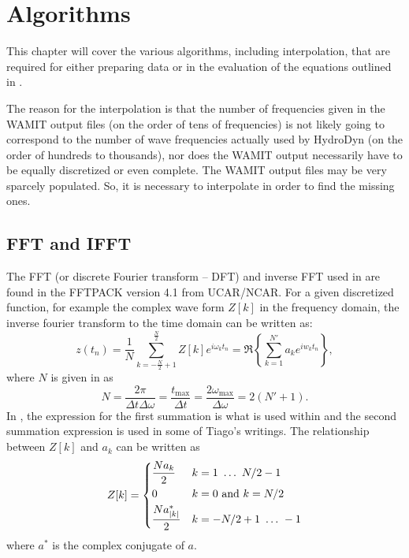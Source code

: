 \chapter{Algorithms}
\label{chap:Algorithm}

This chapter will cover the various algorithms, including interpolation, that are required for either preparing data or in the evaluation of the equations outlined in .


The reason for the interpolation is that the number of frequencies given in the WAMIT output files (on the order of tens of frequencies) is not likely going to correspond to the number of wave frequencies actually used by HydroDyn (on the order of hundreds to thousands), nor does the WAMIT output necessarily have to be equally discretized or even complete.  The WAMIT output files may be very sparcely populated.  So, it is necessary to interpolate in order to find the missing ones.



\section{FFT and IFFT}
\label{sec:Algorithm:FFT}

The FFT (or discrete Fourier transform -- DFT) and inverse FFT used in \HD are found in the FFTPACK version 4.1 from UCAR/NCAR.  For a given discretized function, for example the complex wave form $Z[k]$ in the frequency domain, the inverse fourier transform to the time domain can be written as:
\begin{equation}
   z(t_n) = \frac{1}{N} \sum\limits_{k=-\frac{N}{2}+1}^{\frac{N}{2}} Z[k] e^{i\omega_k t_n} = \Re\left\{\sum\limits_{k=1}^{N'}a_k e^{iw_k t_n}\right\},
\label{eq:IFFTofZ}
\end{equation}
where $N$ is given in  as
\begin{equation}
   N=\frac{2 \pi}{\Delta t \Delta \omega} = \frac{t_\text{max}}{\Delta t} = \frac{2 \omega_\text{max}}{\Delta \omega} = 2(N'+1).
\label{eq:IFFT_N}
\end{equation}
In , the expression for the first summation is what is used within \HD and the second summation expression is used in some of Tiago's writings.  The relationship between $Z[k]$ and $a_k$ can be written as
\begin{equation}
   Z[k] =
         \begin{dcases*}
            \frac{N a_k}{2}            & $k=1 ~\ldots~ N/2-1$\\
            0                          & $k=0$ and $k=N/2$\\
            \frac{N a^*_{|k|}}{2}      & $k=-N/2+1 ~\ldots~ -1$\\
         \end{dcases*}
\label{eq:IFFT_Zk_ak}
\end{equation}
where $a^*$ is the complex conjugate of $a$. 


